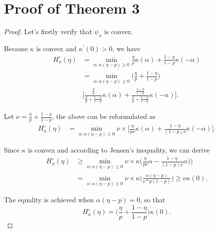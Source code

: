 \documentclass[letterpaper]{article} %
\begin{document}
\section{Proof of Theorem 3}
\begin{proof}

	Let's firstly verify that $\psi_{\kappa}$ is convex.

	Because $\kappa$ is convex and $ \kappa^{\prime}(0) > 0 $, we have
	\begin{align*}
		H^{\circ}_{\kappa} (\eta) & = \min_{\alpha : \alpha  ( \eta - p ) \geq 0} \frac{\eta}{p}\kappa ( \alpha)  + \frac{1 - \eta}{1-p} \kappa ( - \alpha )                                                                                   \\
		                          & = \min_{\alpha : \alpha  ( \eta - p ) \geq 0}  \big( \frac{\eta }{ p } + \frac{ 1-\eta }{ 1 - p } \big)                                                                                                    \\
		                          & \Big[ \frac{ \frac{\eta}{p} }{ \frac{\eta }{ p } +  \frac{ 1-\eta }{ 1 - p } } \kappa ( \alpha)  + \frac{ \frac{1-\eta}{1-p} }{ \frac{\eta }{ p } + \frac{ 1-\eta }{ 1 - p } } \kappa ( - \alpha )  \Big].
	\end{align*}

	Let $ \nu = \frac{\eta }{ p } + \frac{ 1-\eta }{ 1 - p } $, the above can be reformulated as
	\begin{align*}
		H^{\circ}_{\kappa} (\eta) & = \min_{\alpha : \alpha  ( \eta - p ) \geq 0}  \nu \times \Big[ \frac{\eta}{p \nu } \kappa ( \alpha)  + \frac{1-\eta}{ (1-p) \nu } \kappa ( - \alpha )  \Big].
	\end{align*}

	Since $\kappa$ is convex and according to Jensen's inequality, we can derive
	\begin{align*}
		H^{\circ}_{\phi} (\eta) & \geq \min_{\alpha : \alpha  ( \eta - p ) \geq 0}  \nu \times  \kappa \big( \frac{\eta}{p \nu } \alpha  - \frac{1-\eta}{ (1-p) \nu } \alpha )  \big) \\
		                        & = \min_{\alpha : \alpha  ( \eta - p ) \geq 0}  \nu \times \kappa \big( \frac{ \alpha(\eta - p) }{ \nu * p(1-p) }  \big)   \geq \nu  \kappa (0).
	\end{align*}


	The equality is achieved when $ \alpha  ( \eta - p ) = 0 $, so that
	\[ H^{\circ}_{\kappa} ( \eta ) = \big( \frac{\eta }{ p } + \frac{ 1-\eta }{ 1 - p } \big) \kappa (0) .  \]


\end{proof}
\end{document}
